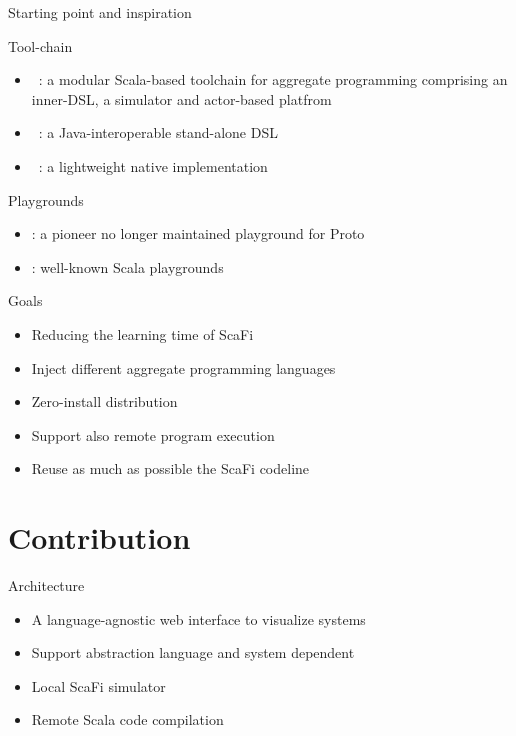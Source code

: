 \documentclass[presentation]{beamer}
\let\oldcite\cite
\newcommand{\scafi}{{\sc{}ScaFi}}
\renewcommand{\cite}[1]{{\color{blue}\oldcite{#1}}}
\begin{document}
\begin{frame}[fragile]{Starting point and inspiration}

\begin{block}{Tool-chain}
  \begin{itemize}
  \item {}~\cite{DBLP:conf/ecoop/CasadeiV16}: a modular Scala-based toolchain for aggregate programming comprising an inner-DSL, a simulator and actor-based platfrom
  \item {}~\cite{ProtelisSAC14}: a Java-interoperable stand-alone DSL
  \item {}~\cite{fcpp}: a lightweight native implementation
  \end{itemize}
\end{block}
  
\begin{block}{Playgrounds}

\begin{itemize}
\item \lenf{WebProto~\cite{DBLP:conf/saso/UsbeckB13}}: a pioneer no longer maintained playground for Proto
\item {}: well-known Scala playgrounds
\end{itemize}

\end{block}
\end{frame}

\begin{frame}[fragile]{Goals}

\begin{itemize}
\item Reducing the learning time of \scafi{}
\item Inject different aggregate programming languages
\item Zero-install distribution
\item Support also remote program execution
\item Reuse as much as possible the \scafi{} codeline
\end{itemize}
  
\end{frame}

\section{Contribution}

\begin{frame}[fragile]{Architecture}

\begin{itemize}
\item A language-agnostic web interface to visualize  systems
\item Support abstraction language and system dependent
\item Local \scafi{} simulator 
\item Remote Scala code compilation
\end{itemize}
\end{frame}
\end{document}
